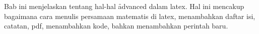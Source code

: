 \chapter{\babTiga}
\label{bab:3}
Bab ini menjelaskan tentang hal-hal \f{advanced} dalam \gls{latex}.
Hal ini mencakup bagaimana cara menulis persamaan matematis di \gls{latex}, menambahkan daftar isi, catatan, \acrshort{pdf}, menambahkan kode, bahkan menambahkan perintah baru.



